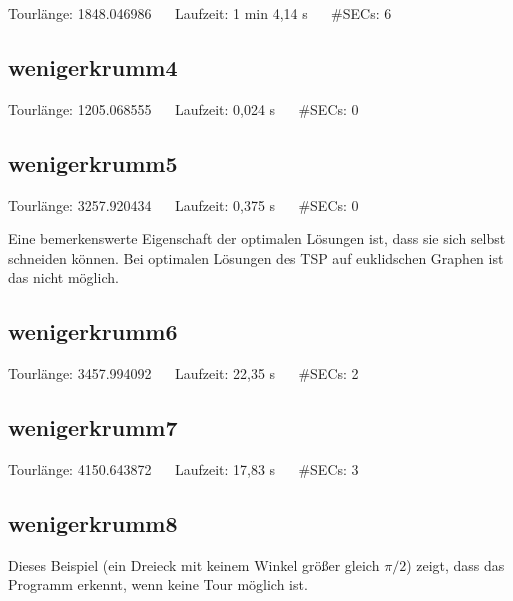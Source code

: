 \documentclass[a4paper, 10pt, ngerman]{article}
\begin{document}


\noindent Tourlänge: 1848.046986 $\quad$ Laufzeit: 1 min 4,14 s $\quad$ \#SECs: 6

\subsection{wenigerkrumm4}



\noindent Tourlänge: 1205.068555 $\quad$ Laufzeit: 0,024 s $\quad$ \#SECs: 0

\subsection{wenigerkrumm5}



\noindent Tourlänge: 3257.920434 $\quad$ Laufzeit: 0,375 s $\quad$ \#SECs: 0
\medskip

\noindent Eine bemerkenswerte Eigenschaft der optimalen Lösungen ist, dass sie sich selbst schneiden können. Bei optimalen Lösungen des TSP auf euklidschen Graphen ist das nicht möglich. 

\subsection{wenigerkrumm6}



\noindent Tourlänge: 3457.994092 $\quad$ Laufzeit: 22,35 s $\quad$ \#SECs: 2

\subsection{wenigerkrumm7}



\noindent Tourlänge: 4150.643872 $\quad$ Laufzeit: 17,83 s $\quad$ \#SECs: 3

\subsection{wenigerkrumm8}

Dieses Beispiel (ein Dreieck mit keinem Winkel größer gleich $\pi / 2$) zeigt, dass das Programm erkennt, wenn keine Tour möglich ist.
\medskip
\end{document}
